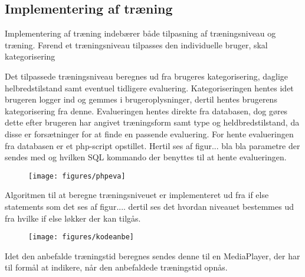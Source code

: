\subsection{Implementering af træning}
Implementering af træning indebærer både tilpasning af træningsniveau og træning. 
Førend et træningsniveau tilpasses den individuelle bruger, skal kategorisering

Det tilpassede træningsniveau beregnes ud fra brugeres kategorisering, daglige helbredstilstand samt eventuel tidligere evaluering.
Kategoriseringen hentes idet brugeren logger ind og gemmes i brugeroplysninger, dertil hentes brugerens kategorisering fra denne.
Evalueringen hentes direkte fra databasen, dog gøres dette efter brugeren har angivet træningsform samt type og heldbredstilstand, da disse er forsætninger for at finde en passende evaluering.
For hente evalueringen fra databasen er et php-script opstillet. Hertil ses af figur... bla bla parametre der sendes med og hvilken SQL kommando der benyttes til at hente evalueringen. 

\begin{figure} [H]
\centering
\texttt{[image: figures/phpeva]}
\caption{}
\label{fig:phpeva}
\end{figure} 


Algoritmen til at beregne træningsniveuet er implementeret ud fra if else statements som det ses af figur.... dertil ses det hvordan niveauet bestemmes ud fra hvilke if else løkker der kan tilgås.  

\begin{figure} [H]
\centering
\texttt{[image: figures/kodeanbe]}
\caption{}
\label{fig:kodeanbe}
\end{figure} 



Idet den anbefalde træningstid beregnes sendes denne til en MediaPlayer, der har til formål at indikere, når den anbefaldede træningstid opnås. 




